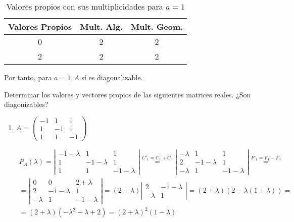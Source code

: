 \begin{ejercicio}
\begin{itemize}
        \begin{table}[H]
            \centering
            \begin{tabular}{c|c|c}
                Valores Propios & Mult. Alg. & Mult. Geom. \\ \hline 
                0 & 2 & 2\\
                2 & 2 & 2\\
            \end{tabular}
            \caption{Valores propios con sus multiplicidades para $a=1$}
        \end{table}
        Por tanto, para $a=1, A$ sí es diagonalizable.
    \end{itemize}
    
\end{ejercicio}


\begin{ejercicio}
    Determinar los valores y vectores propios de las siguientes matrices reales. ¿Son diagonizables?

    \begin{enumerate}
        \item $A = \left( \begin{array}{ccc}
            -1 & 1 & 1 \\
            1  & -1 & 1 \\
            1 & 1 & -1
        \end{array}\right)$

        \begin{multline*}
            P_A(\lambda) = \left| \begin{array}{ccc}
            -1-\lambda & 1 & 1 \\
            1  & -1-\lambda & 1 \\
            1 & 1 & -1-\lambda
        \end{array}\right| \stackrel{C'_1 = C_1+C_3}{=}\left| \begin{array}{ccc}
            -\lambda & 1 & 1 \\
            2  & -1-\lambda & 1 \\
            -\lambda & 1 & -1-\lambda
        \end{array}\right| \stackrel{F'_1 = F_1-F_3}{=} \\
        = \left| \begin{array}{ccc}
            0 & 0 & 2+\lambda \\
            2  & -1-\lambda & 1 \\
            -\lambda & 1 & -1-\lambda
        \end{array}\right| = (2+\lambda)\left| \begin{array}{cc}
            2  & -1-\lambda \\
            -\lambda & 1
        \end{array}\right| = (2+\lambda)(2-\lambda(1+\lambda))= \\  = (2+\lambda)(-\lambda^2 - \lambda +2) = (2+\lambda)^2(1-\lambda)
        \end{multline*}


\end{enumerate}
\end{ejercicio}
